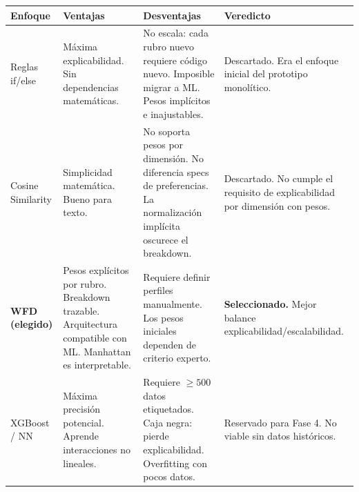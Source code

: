 \documentclass[11pt,a4paper]{article}
\begin{document}
\begin{table}[H]
    \centering
    \renewcommand{\arraystretch}{1.2}
    \begin{tabularx}{\textwidth}{>{\hsize=0.2\hsize}X >{\hsize=0.25\hsize}X >{\hsize=0.25\hsize}X >{\hsize=0.3\hsize}X}
        \toprule
        \textbf{Enfoque} & \textbf{Ventajas} & \textbf{Desventajas} & \textbf{Veredicto} \\
        \midrule
        Reglas if/else & Máxima explicabilidad. Sin dependencias matemáticas. & No escala: cada rubro nuevo requiere código nuevo. Imposible migrar a ML. Pesos implícitos e inajustables. & Descartado. Era el enfoque inicial del prototipo monolítico. \\
        Cosine Similarity & Simplicidad matemática. Bueno para texto. & No soporta pesos por dimensión. No diferencia specs de preferencias. La normalización implícita oscurece el breakdown. & Descartado. No cumple el requisito de explicabilidad por dimensión con pesos. \\
        \textbf{WFD (elegido)} & Pesos explícitos por rubro. Breakdown trazable. Arquitectura compatible con ML. Manhattan es interpretable. & Requiere definir perfiles manualmente. Los pesos iniciales dependen de criterio experto. & \textbf{Seleccionado.} Mejor balance explicabilidad/escalabilidad. \\
        XGBoost / NN & Máxima precisión potencial. Aprende interacciones no lineales. & Requiere $\geq 500$ datos etiquetados. Caja negra: pierde explicabilidad. Overfitting con pocos datos. & Reservado para Fase 4. No viable sin datos históricos. \\
        \bottomrule
    \end{tabularx}
\end{table}
\end{document}
